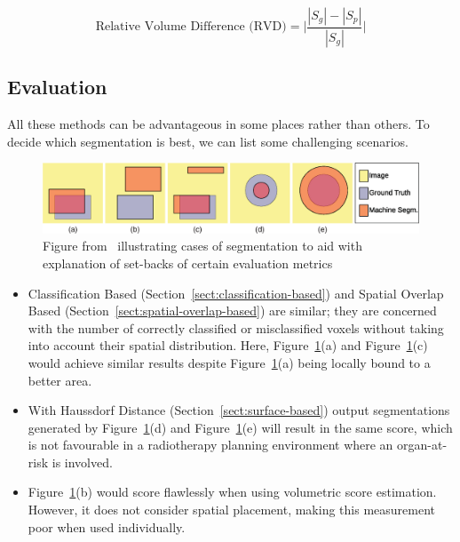 \documentclass[12pt,twoside]{report}
\begin{document}
\begin{equation*}
 \text{Relative Volume Difference (RVD)} = \bigg| \frac{|S_g|-|S_p|}{|S_g|}\bigg|
\end{equation*}

\subsection{Evaluation}\label{sect:evaluation-of-evaluation-methods}

All these methods can be advantageous in some places rather than others. To decide which segmentation is best, we can list some challenging scenarios.

\begin{figure}[H]
  \centering
  \includegraphics[width=\linewidth]{../figures/segmentation-cases-1.png}
  \caption{Figure from~\cite{boundary-overlap-metrics} illustrating cases of segmentation to aid with explanation of set-backs of certain evaluation metrics}\label{fig:segmentation-cases-1}
\end{figure}

\begin{itemize}
  \item Classification Based (Section~\ref{sect:classification-based}) and Spatial Overlap Based (Section~\ref{sect:spatial-overlap-based}) are similar; they are concerned with the number of correctly classified or misclassified voxels without taking into account their spatial distribution. Here, Figure~\ref{fig:segmentation-cases-1}(a) and Figure~\ref{fig:segmentation-cases-1}(c) would achieve similar results despite Figure~\ref{fig:segmentation-cases-1}(a) being locally bound to a better area.
  \item With Haussdorf Distance (Section~\ref{sect:surface-based}) output segmentations generated by Figure~\ref{fig:segmentation-cases-1}(d) and Figure~\ref{fig:segmentation-cases-1}(e) will result in the same score, which is not favourable in a radiotherapy planning environment where an organ-at-risk is involved.
  \item Figure~\ref{fig:segmentation-cases-1}(b) would score flawlessly when using volumetric score estimation. However, it does not consider spatial placement, making this measurement poor when used individually.
\end{itemize}
\end{document}
